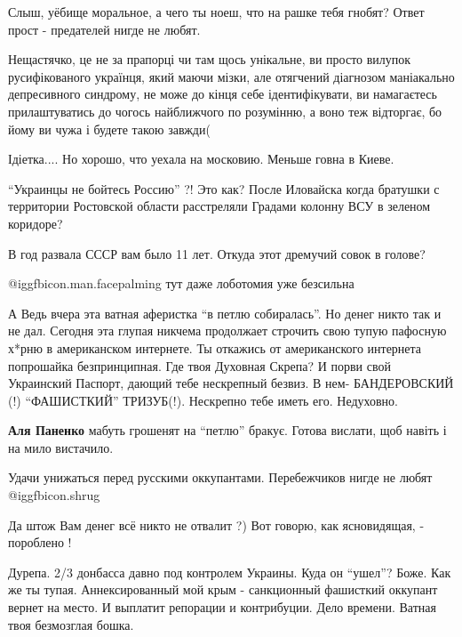 \begin{itemize}
\begin{itemize}
\end{itemize} %

Слыш, уёбище моральное, а чего ты ноеш, что на рашке тебя гнобят? Ответ прост - предателей нигде не любят.


Нещастячко, це не за прапорці чи там щось унікальне, ви просто вилупок
русифікованого українця, який маючи мізки, але отягчений діагнозом маніакально
депресивного синдрому, не може до кінця себе ідентифікувати, ви намагаєтесь
прилаштуватись до чогось найближчого по розумінню, а воно теж відторгає, бо йому
ви чужа і будете такою завжди(


Ідіетка....
Но хорошо, что уехала на московию.
Меньше говна в Киеве.

\enquote{Украинцы не бойтесь Россию} ?!
Это как? После Иловайска когда братушки с территории Ростовской области расстреляли Градами колонну ВСУ в зеленом коридоре?

В год развала СССР вам было 11 лет. Откуда этот дремучий совок в голове?

 @igg{fbicon.man.facepalming}  тут даже лоботомия уже безсильна


А Ведь вчера эта ватная аферистка \enquote{в петлю собиралась}. Но денег никто так и не
дал. Сегодня эта глупая никчема продолжает строчить свою тупую пафосную х*рню в
американском интернете. Ты откажись от американского интернета попрошайка
безпринципная. Где твоя Духовная Скрепа? И порви свой Украинский Паспорт,
дающий тебе нескрепный безвиз. В нем- БАНДЕРОВСКИЙ (!) \enquote{ФАШИСТКИЙ} ТРИЗУБ(!).
Нескрепно тебе иметь его. Недуховно.

\textbf{Аля Паненко} мабуть грошенят на \enquote{петлю} бракує. Готова вислати, щоб навіть і на мило вистачило.

Удачи унижаться перед русскими оккупантами. Перебежчиков нигде не любят  @igg{fbicon.shrug} 

Да штож Вам денег всё никто не отвалит ?) Вот говорю, как ясновидящая, - пороблено !


Дурепа. 2/3 донбасса давно под контролем Украины. Куда он \enquote{ушел}? Боже. Как же
ты тупая. Аннексированный мой крым - санкционный фашисткий оккупант вернет на
место. И выплатит репорации и контрибуции. Дело времени. Ватная твоя безмозглая
бошка.


\end{itemize}

